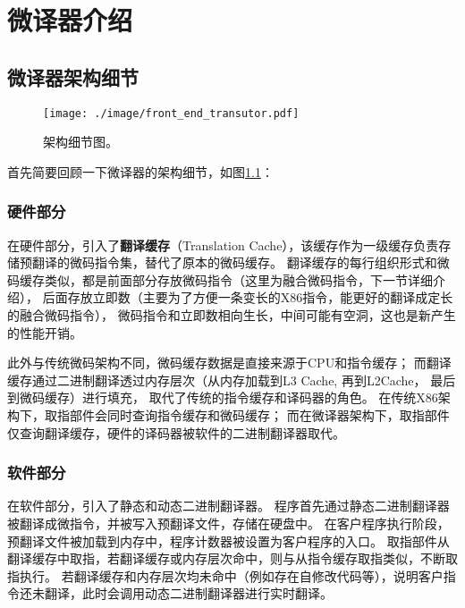 \chapter{微译器介绍}\label{chap:MUT}

\section{微译器架构细节}

\begin{figure}[h]
  \centering
  \texttt{[image: ./image/front\_end\_transutor.pdf]}
  \caption{架构细节图。}
  \label{img:front_end_transutor}
\end{figure}

首先简要回顾一下微译器的架构细节，如图\ref{img:front_end_transutor}：

\subsection{硬件部分}

在硬件部分，引入了\textbf{翻译缓存}（Translation Cache），该缓存作为一级缓存负责存储预翻译的微码指令集，替代了原本的微码缓存。
翻译缓存的每行组织形式和微码缓存类似，都是前面部分存放微码指令（这里为融合微码指令，下一节详细介绍），
后面存放立即数（主要为了方便一条变长的X86指令，能更好的翻译成定长的融合微码指令），
微码指令和立即数相向生长，中间可能有空洞，这也是新产生的性能开销。

此外与传统微码架构不同，微码缓存数据是直接来源于CPU和指令缓存；
而翻译缓存通过二进制翻译透过内存层次（从内存加载到L3 Cache, 再到L2Cache， 最后到微码缓存）进行填充，
取代了传统的指令缓存和译码器的角色。
在传统X86架构下，取指部件会同时查询指令缓存和微码缓存；
而在微译器架构下，取指部件仅查询翻译缓存，硬件的译码器被软件的二进制翻译器取代。

\subsection{软件部分}

在软件部分，引入了静态和动态二进制翻译器。
程序首先通过静态二进制翻译器被翻译成微指令，并被写入预翻译文件，存储在硬盘中。
在客户程序执行阶段，预翻译文件被加载到内存中，程序计数器被设置为客户程序的入口。
取指部件从翻译缓存中取指，若翻译缓存或内存层次命中，则与从指令缓存取指类似，不断取指执行。
若翻译缓存和内存层次均未命中（例如存在自修改代码等），说明客户指令还未翻译，此时会调用动态二进制翻译器进行实时翻译。



